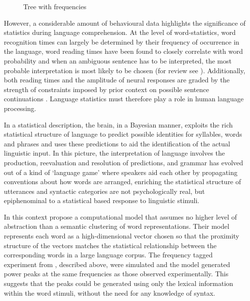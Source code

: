 \documentclass[a4paper,10pt,twoside]{article}
\begin{document}
\begin{figure}[tb]
\begin{center}
\end{center}
\caption{Tree with frequencies \label{fig:freq_tree}}
\end{figure}

However, a considerable amount of behavioural data highlights the
significance of statistics during language comprehension. At the level
of word-statistics, word recognition times can largely be determined
by their frequency of occurrence in the language, word reading times
have been found to closely correlate with word probability and when an
ambiguous sentence has to be interpreted, the most probable
interpretation is most likely to be chosen (for review see
\cite{Jurafsky2002}). Additionally, both reading times and the
amplitude of neural responses are graded by the strength of
constraints imposed by prior context on possible sentence
continuations \cite{GibsonPearlmutter1998}. Language statistics must
therefore play a role in human language processing. 


In a statistical description, the brain, in a
Bayesian manner, exploits the rich statistical structure of language
to predict possible identities for syllables, words and phrases and
uses these predictions to aid the identification of the actual
linguistic input. In this picture, the interpretation of language
involves the production, reevaluation and resolution of predictions,
and grammar has evolved out of a kind of \lq{}language game\rq{} where
speakers aid each other by propagating conventions about how words are
arranged, enriching the statistical structure of utterances and syntactic categories are not psychologically real, but epiphenominal to a statistical based response to linguistic
stimuli.

In this context \cite{FrankYang2018} propose a computational model that
assumes no higher level of abstraction than a semantic
clustering of word representations. Their model represents each word
as a high-dimensional vector chosen so that the proximity structure of
the vectors matches the statistical relationship between the
corresponding words in a large language corpus. The frequency tagged
experiment from \cite{DingEtAl2016}, described above, were simulated
and the model generated power peaks at the same frequencies as those
observed experimentally. This suggests that the peaks could be
generated using only the lexical information within the word stimuli,
without the need for any knowledge of syntax. 
\end{document}
